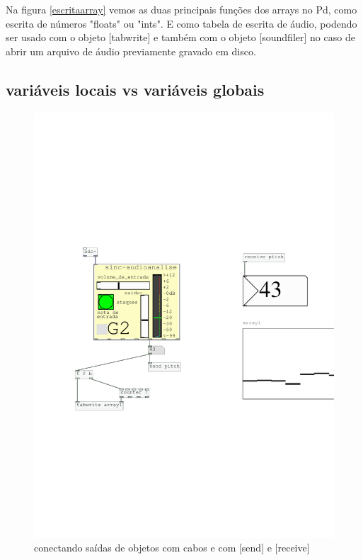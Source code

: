 \documentclass{ppgmus}
\begin{document}
Na figura \ref{escritaarray} vemos as duas principais funções dos arrays
no Pd, como escrita de números "floats" ou "ints". E como tabela de escrita
de áudio, podendo ser usado com o objeto [tabwrite\texttildelow] e também
com o objeto [soundfiler] no caso de abrir um arquivo de áudio previamente
gravado em disco.







\subsection{variáveis locais vs variáveis globais}

\begin{figure}
\includegraphics[scale=.6]{ex-conexoes}
\caption{conectando saídas de objetos com cabos e com [send] e [receive]}
\label{ex-conexoes}
\end{figure}
\end{document}
